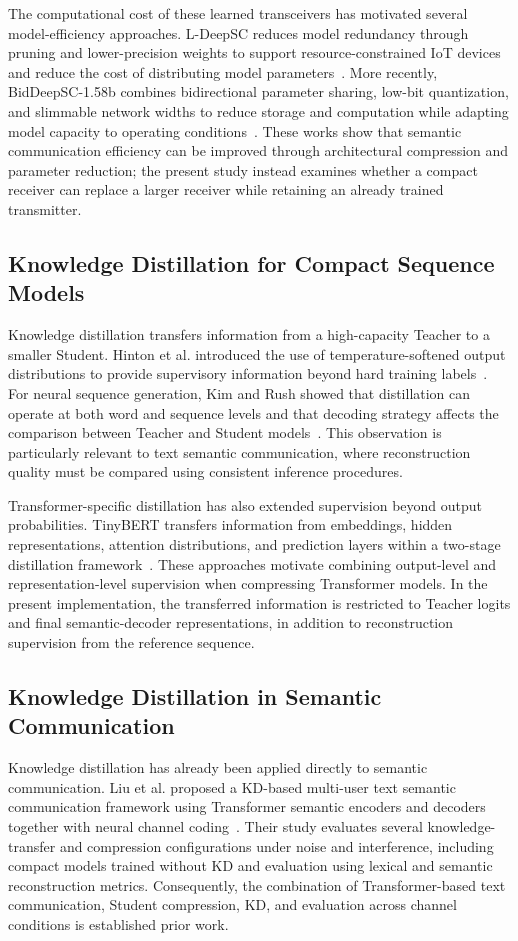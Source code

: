\documentclass[conference]{IEEEtran}
\begin{document}
The computational cost of these learned transceivers has motivated several model-efficiency approaches. L-DeepSC reduces model redundancy through pruning and lower-precision weights to support resource-constrained IoT devices and reduce the cost of distributing model parameters~\cite{xie2021lite}. More recently, BidDeepSC-1.58b combines bidirectional parameter sharing, low-bit quantization, and slimmable network widths to reduce storage and computation while adapting model capacity to operating conditions~\cite{do2026biddeepsc}. These works show that semantic communication efficiency can be improved through architectural compression and parameter reduction; the present study instead examines whether a compact receiver can replace a larger receiver while retaining an already trained transmitter.

\subsection{Knowledge Distillation for Compact Sequence Models}
Knowledge distillation transfers information from a high-capacity Teacher to a smaller Student. Hinton et al. introduced the use of temperature-softened output distributions to provide supervisory information beyond hard training labels~\cite{hinton2015distilling}. For neural sequence generation, Kim and Rush showed that distillation can operate at both word and sequence levels and that decoding strategy affects the comparison between Teacher and Student models~\cite{kim2016sequencekd}. This observation is particularly relevant to text semantic communication, where reconstruction quality must be compared using consistent inference procedures.

Transformer-specific distillation has also extended supervision beyond output probabilities. TinyBERT transfers information from embeddings, hidden representations, attention distributions, and prediction layers within a two-stage distillation framework~\cite{jiao2020tinybert}. These approaches motivate combining output-level and representation-level supervision when compressing Transformer models. In the present implementation, the transferred information is restricted to Teacher logits and final semantic-decoder representations, in addition to reconstruction supervision from the reference sequence.

\subsection{Knowledge Distillation in Semantic Communication}
Knowledge distillation has already been applied directly to semantic communication. Liu et al. proposed a KD-based multi-user text semantic communication framework using Transformer semantic encoders and decoders together with neural channel coding~\cite{liu2024kdsemcom}. Their study evaluates several knowledge-transfer and compression configurations under noise and interference, including compact models trained without KD and evaluation using lexical and semantic reconstruction metrics. Consequently, the combination of Transformer-based text communication, Student compression, KD, and evaluation across channel conditions is established prior work.
\end{document}
